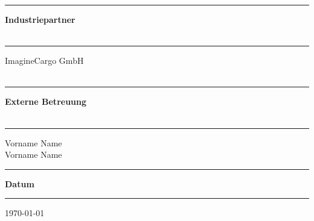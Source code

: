 \begin{titlepage}
\begin{minipage}[b]{0.91\textwidth}
	\begin{minipage}[b]{0.27\textwidth}
	\hrule\vskip 0.5cm
		\textbf{Industriepartner}\\
		\\
	\end{minipage}
	\begin{minipage}[b]{0.03\textwidth}
	\hskip 0.5cm
	\end{minipage}
	\begin{minipage}[b]{0.7\textwidth}
	\hrule\vskip 0.5cm
		ImagineCargo GmbH\\
		\\
	\end{minipage}

	\begin{minipage}[b]{0.27\textwidth}
	\hrule\vskip 0.5cm
		\textbf{Externe Betreuung}\\
		\\
	\end{minipage}
	\begin{minipage}[b]{0.03\textwidth}
	\hskip 0.5cm
	\end{minipage}
	\begin{minipage}[b]{0.7\textwidth}
	\hrule\vskip 0.5cm
		Vorname Name\\
		Vorname Name\\
	\end{minipage}

	\begin{minipage}[b]{0.27\textwidth}
	\hrule\vskip 0.5cm
		\textbf{Datum}
	\end{minipage}
	\begin{minipage}[b]{0.03\textwidth}
	\hskip 0.5cm
	\end{minipage}
	\begin{minipage}[b]{0.7\textwidth}
	\hrule\vskip 0.5cm
		\today
	\end{minipage}
\end{minipage}
\vskip 0.5cm


\end{titlepage}
